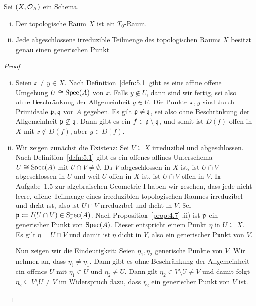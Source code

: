 \begin{prop}
\label{prop:5.4}
	Sei $(X, \mathcal{O}_X)$ ein Schema.
	\begin{enumerate}[i)]
		\item Der topologische Raum $X$ ist ein $T_0$-Raum.
		\item Jede abgeschlossene irreduzible Teilmenge des topologischen Raums $X$ besitzt genau einen generischen Punkt.
	\end{enumerate}
	\begin{proof}
		\begin{enumerate}[i)]
			\item Seien $x\neq y \in X$. Nach Definition~\ref{defn:5.1} gibt es eine affine offene Umgebung $U \cong \operatorname{Spec}(A)$ von $x$. Falls $y \notin U$, dann sind wir fertig, sei also ohne Beschränkung der Allgemeinheit $y \in U$. Die Punkte $x,y$ sind durch Primideale $\mathfrak{p},\mathfrak{q}$ von $A$ gegeben. Es gilt $\mathfrak{p} \neq \mathfrak{q}$, sei also ohne Beschränkung der Allgemeinheit $\mathfrak{p} \not\subseteq \mathfrak{q}$. Dann gibt es ein $f \in \mathfrak{p} \setminus \mathfrak{q}$, und somit ist $D(f)$ offen in $X$ mit $x \notin D(f)$, aber $y\in D(f)$.
			\item Wir zeigen zunächst die Existenz: Sei $V\subseteq X$ irreduzibel und abgeschlossen. Nach Definition~\ref{defn:5.1} gibt es ein offenes affines Unterschema $U \cong \operatorname{Spec}(A)$ mit $U \cap V \neq \emptyset$. Da $V$ abgeschlossen in $X$ ist, ist $U \cap V$ abgeschlossen in $U$ und weil $U$ offen in $X$ ist, ist $U \cap V$ offen in $V$. In Aufgabe~1.5 zur algebraischen Geometrie I haben wir gesehen, dass jede nicht leere, offene Teilmenge eines irreduziblen topologischen Raumes irreduzibel und dicht ist, also ist $U \cap V$ irreduzibel und dicht in $V$. Sei $\mathfrak{p} \coloneqq I(U \cap V) \in \operatorname{Spec}(A)$. Nach Proposition~\ref{prop:4.7} iii) ist $\mathfrak{p}$ ein generischer Punkt von $\operatorname{Spec}(A)$. Dieser entspricht einem Punkt $\eta$ in $U \subseteq X$. Es gilt $\overline{\eta}=U\cap V$ und damit ist $\eta$ dicht in $V$, also ein generischer Punkt von $V$.

			Nun zeigen wir die Eindeutigkeit: Seien $\eta_1,\eta_2$ generische Punkte von $V$. Wir nehmen an, dass $\eta_1 \neq \eta_1$. Dann gibt es ohne Beschränkung der Allgemeinheit ein offenes $U$ mit $\eta_1 \in U$ und $\eta_2 \neq U$. Dann gilt $\eta_2 \in V\setminus U \neq V$ und damit folgt $\overline{\eta_2} \subseteq V\setminus U \neq V$ im Widerspruch dazu, dass $\eta_2$ ein generischer Punkt von $V$ ist.
		\end{enumerate}
	\end{proof}
\end{prop}

